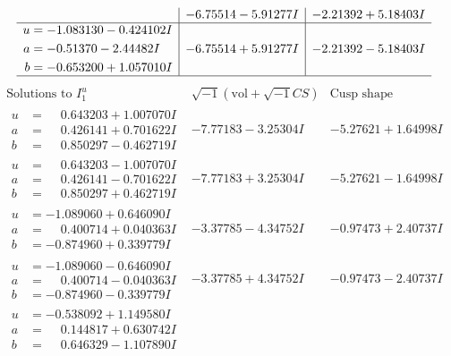 \documentclass[1p]{elsarticle_modified}
\theoremstyle{definition}
\newcommand{\I}{\sqrt{-1}}
\begin{document}
$$\begin{array}{c|c|c}
 & -6.75514 - 5.91277 I & -2.21392 + 5.18403 I \\ \hline\begin{aligned}
u &= -1.083130 - 0.424102 I \\
a &= -0.51370 - 2.44482 I \\
b &= -0.653200 + 1.057010 I\end{aligned}
 & -6.75514 + 5.91277 I & -2.21392 - 5.18403 I\\
 \hline 
 \end{array}$$\newpage$$\begin{array}{c|c|c}  
\text{Solutions to }I^u_{1}& \I (\text{vol} + \sqrt{-1}CS) & \text{Cusp shape}\\
 \hline 
\begin{aligned}
u &= \phantom{-}0.643203 + 1.007070 I \\
a &= \phantom{-}0.426141 + 0.701622 I \\
b &= \phantom{-}0.850297 - 0.462719 I\end{aligned}
 & -7.77183 - 3.25304 I & -5.27621 + 1.64998 I \\ \hline\begin{aligned}
u &= \phantom{-}0.643203 - 1.007070 I \\
a &= \phantom{-}0.426141 - 0.701622 I \\
b &= \phantom{-}0.850297 + 0.462719 I\end{aligned}
 & -7.77183 + 3.25304 I & -5.27621 - 1.64998 I \\ \hline\begin{aligned}
u &= -1.089060 + 0.646090 I \\
a &= \phantom{-}0.400714 + 0.040363 I \\
b &= -0.874960 + 0.339779 I\end{aligned}
 & -3.37785 - 4.34752 I & -0.97473 + 2.40737 I \\ \hline\begin{aligned}
u &= -1.089060 - 0.646090 I \\
a &= \phantom{-}0.400714 - 0.040363 I \\
b &= -0.874960 - 0.339779 I\end{aligned}
 & -3.37785 + 4.34752 I & -0.97473 - 2.40737 I \\ \hline\begin{aligned}
u &= -0.538092 + 1.149580 I \\
a &= \phantom{-}0.144817 + 0.630742 I \\
b &= \phantom{-}0.646329 - 1.107890 I\end{aligned}

\end{array}$$
\end{document}
